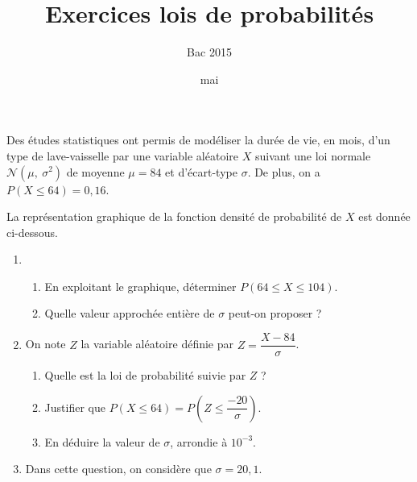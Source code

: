 \documentclass[12pt,french]{article}
\title{Exercices lois de probabilités}
\date{mai \the\year}
\author{Bac 2015}
\begin{document}
\maketitle

\begin{question}[subtitle={Pondichery 2015}]
Des études statistiques ont permis de modéliser la durée de vie, en mois,
d'un type de lave-vaisselle par une variable aléatoire $X$ suivant une loi
normale $\mathcal{N}\left(\mu,~ \sigma^2\right)$ de moyenne $\mu = 84$ et
d'écart-type $\sigma$. De plus, on a $P(X \leqslant 64) = 0,16$. 

La représentation graphique de la fonction densité de probabilité de $X$ est
donnée ci-dessous.

\begin{center}
\end{center}

\begin{enumerate}
  \item 
    \begin{enumerate}
      \item En exploitant le graphique, déterminer $P(64 \leqslant X
        \leqslant 104)$.
      \item Quelle valeur approchée entière de $\sigma$ peut-on proposer ?
    \end{enumerate}
  \item On note $Z$ la variable aléatoire définie par $Z = \dfrac{X -
    84}{\sigma}$.
    \begin{enumerate}
      \item Quelle est la loi de probabilité suivie par $Z$ ?
      \item Justifier que $P(X \leqslant 64) = P \left(Z \leqslant \dfrac{-
        20}{\sigma}\right)$.
      \item En déduire la valeur de $\sigma$, arrondie à $10^{-3}$.
    \end{enumerate}
  \item Dans cette question, on considère que $\sigma = 20,1$.


\end{enumerate}
\end{question}
\end{document}
